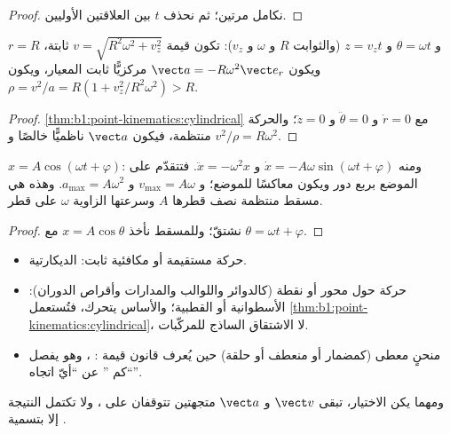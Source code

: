 \begin{proof}
نكامل مرتين؛ ثم نحذف $t$ بين العلاقتين الأوليين.
\end{proof}

\begin{proposition}\label{prop:b1:point-kinematics:helix}
$r = R$ و $\theta = \omega t$ و $z = v_zt$ (والثوابت $R$ و $\omega$ و $v_z$):
تكون قيمة  $v = \sqrt{R^2\omega^2 + v_z^2}$ ثابتة، ويكون 
$\vect a = -R\omega^2\vect e_r$ مركزيًّا ثابت المعيار، ويكون
 $\rho = v^2/a = R(1 + v_z^2/R^2\omega^2) > R$.
\end{proposition}

\begin{proof}
\cref{thm:b1:point-kinematics:cylindrical} مع $\dot r = 0$ و
$\ddot\theta = 0$ و $\ddot z = 0$؛ والحركة منتظمة، فيكون $\vect a$ ناظميًّا
خالصًا و $v^2/\rho = R\omega^2$.
\end{proof}

\begin{proposition}\label{prop:b1:point-kinematics:harmonic}
$x = A\cos(\omega t + \varphi)$: ومنه $\dot x = -A\omega\sin(\omega t + \varphi)$ و
$\ddot x = -\omega^2 x$. فتتقدّم  على الموضع بربع
دور ويكون  معاكسًا للموضع؛ و $v_{\max} =
A\omega$ و $a_{\max} = A\omega^2$. وهذه هي مسقط  منتظمة
نصف قطرها $A$ وسرعتها الزاوية $\omega$ على قطر.
\end{proposition}

\begin{proof}
نشتقّ؛ وللمسقط نأخذ $x = A\cos\theta$ مع $\theta =
\omega t + \varphi$.
\end{proof}

\begin{method}\label{met:b1:point-kinematics:choose}
\begin{itemize}
  \item حركة مستقيمة أو مكافئية  ثابت:
        الديكارتية.
  \item حركة حول محور أو نقطة (كالدوائر واللوالب والمدارات
        وأقراص الدوران): الأسطوانية أو القطبية؛ والأساس يتحرك، فتُستعمل
        \cref{thm:b1:point-kinematics:cylindrical}، لا الاشتقاق
        الساذج للمركّبات.
  \item منحنٍ معطى (كمضمار أو منعطف أو حلقة) حين يُعرف قانون قيمة :
        ، وهو يفصل ``كم '' عن ``أيّ اتجاه''.
\end{itemize}
ومهما يكن الاختيار، تبقى $\vect v$ و $\vect a$ متجهتين تتوقفان على
، ولا تكتمل النتيجة إلا بتسمية .
\end{method}

